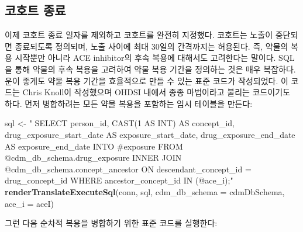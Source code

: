 \documentclass[11pt]{book}
\newenvironment{Shaded}{\begin{snugshade}}{\end{snugshade}}
\newcommand{\KeywordTok}[1]{\textcolor[rgb]{0.13,0.29,0.53}{\textbf{#1}}}
\newcommand{\DataTypeTok}[1]{\textcolor[rgb]{0.13,0.29,0.53}{#1}}
\newcommand{\StringTok}[1]{\textcolor[rgb]{0.31,0.60,0.02}{#1}}
\newcommand{\NormalTok}[1]{#1}
\theoremstyle{definition}
\theoremstyle{definition}
\theoremstyle{definition}
\theoremstyle{remark}
\begin{document}
\subsection{코호트 종료}\label{-}

이제 코호트 종료 일자를 제외하고 코호트를 완전히 지정했다. 코호트는
노출이 중단되면 종료되도록 정의되며, 노출 사이에 최대 30일의 간격까지는
허용된다. 즉, 약물의 복용 시작뿐만 아니라 ACE inhibitor의 후속 복용에
대해서도 고려한다는 말이다. SQL을 통해 약물의 후속 복용을 고려하여 약물
복용 기간을 정의하는 것은 매우 복잡하다. 운이 좋게도 약물 복용 기간을
효율적으로 만들 수 있는 표준 코드가 작성되었다. 이 코드는 Chris Knoll이
작성했으며 OHDSI 내에서 종종 마법이라고 불리는 코드이기도 하다. 먼저
병합하려는 모든 약물 복용을 포함하는 임시 테이블을 만든다:

\begin{Shaded}
\begin{Highlighting}[]
\NormalTok{sql <-}\StringTok{ "}
\StringTok{  SELECT person_id,}
\StringTok{    CAST(1 AS INT) AS concept_id,}
\StringTok{    drug_exposure_start_date AS exposure_start_date,}
\StringTok{    drug_exposure_end_date AS exposure_end_date}
\StringTok{  INTO #exposure}
\StringTok{  FROM @cdm_db_schema.drug_exposure}
\StringTok{  INNER JOIN @cdm_db_schema.concept_ancestor}
\StringTok{    ON descendant_concept_id = drug_concept_id}
\StringTok{  WHERE ancestor_concept_id IN (@ace_i);"}
\KeywordTok{renderTranslateExecuteSql}\NormalTok{(conn,}
\NormalTok{                          sql,}
                          \DataTypeTok{cdm_db_schema =}\NormalTok{ cdmDbSchema,}
                          \DataTypeTok{ace_i =}\NormalTok{ aceI)}
\end{Highlighting}
\end{Shaded}

그런 다음 순차적 복용을 병합하기 위한 표준 코드를 실행한다:
\end{document}

